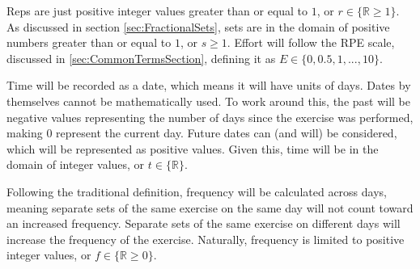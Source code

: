 Reps are just positive integer values greater than or equal to $1$, or $r\in \{ \mathbb{R}\ge 1 \}$. 
As discussed in section \ref{sec:FractionalSets}, sets are in the domain of positive numbers greater than or equal to $1$, or $s\ge 1$. Effort will follow the RPE scale, discussed in \ref{sec:CommonTermsSection}, defining it as $E\in \{0,0.5,1,...,10\}$.

Time will be recorded as a date, which means it will have units of days. Dates by themselves cannot be mathematically used. To work around this, the past will be negative values representing the number of days since the exercise was performed, making $0$ represent the current day. Future dates can (and will) be considered, which will be represented as positive values. Given this, time will be in the domain of integer values, or $t\in \{ \mathbb{R} \}$.

Following the traditional definition, frequency will be calculated across days, meaning separate sets of the same exercise on the same day will not count toward an increased frequency. Separate sets of the same exercise on different days will increase the frequency of the exercise. Naturally, frequency is limited to positive integer values, or $f\in \{ \mathbb{R}\ge 0 \}$.